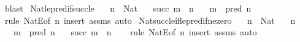 \begin{isabellebody}
\ blast%
\endisatagproof
{\isafoldproof}%
%
\isadelimproof
\isanewline
%
\endisadelimproof
\isanewline
{}\isamarkupfalse%
\ Nat{\isacharunderscore}{\kern0pt}le{\isacharunderscore}{\kern0pt}pred{\isacharunderscore}{\kern0pt}if{\isacharunderscore}{\kern0pt}succ{\isacharunderscore}{\kern0pt}le{\isacharcolon}{\kern0pt}\isanewline
\ \ \ {\isachardoublequoteopen}n\ {\isacharcolon}{\kern0pt}\ Nat{\isachardoublequoteclose}\isanewline
\ \ \ {\isachardoublequoteopen}succ\ m\ {\isasymle}\ n{\isachardoublequoteclose}\isanewline
\ \ \ {\isachardoublequoteopen}m\ {\isasymle}\ pred\ n{\isachardoublequoteclose}\isanewline
%
\isadelimproof
\ \ %
\endisadelimproof
%
\isatagproof
{}\isamarkupfalse%
\ {\isacharparenleft}{\kern0pt}rule\ NatE{\isacharbrackleft}{\kern0pt}of\ n{\isacharbrackright}{\kern0pt}{\isacharparenright}{\kern0pt}\ {\isacharparenleft}{\kern0pt}insert\ assms{\isacharcomma}{\kern0pt}\ auto{\isacharparenright}{\kern0pt}%
\endisatagproof
{\isafoldproof}%
%
\isadelimproof
\isanewline
%
\endisadelimproof
\isanewline
{}\isamarkupfalse%
\ Nat{\isacharunderscore}{\kern0pt}succ{\isacharunderscore}{\kern0pt}le{\isacharunderscore}{\kern0pt}if{\isacharunderscore}{\kern0pt}le{\isacharunderscore}{\kern0pt}pred{\isacharunderscore}{\kern0pt}if{\isacharunderscore}{\kern0pt}ne{\isacharunderscore}{\kern0pt}zero{\isacharcolon}{\kern0pt}\isanewline
\ \ \ {\isachardoublequoteopen}n\ {\isacharcolon}{\kern0pt}\ Nat{\isachardoublequoteclose}\isanewline
\ \ \ {\isachardoublequoteopen}n\ {\isasymnoteq}\ {}{\isachardoublequoteclose}\isanewline
\ \ \ {\isachardoublequoteopen}m\ {\isasymle}\ pred\ n{\isachardoublequoteclose}\isanewline
\ \ \ {\isachardoublequoteopen}succ\ m\ {\isasymle}\ n{\isachardoublequoteclose}\isanewline
%
\isadelimproof
\ \ %
\endisadelimproof
%
\isatagproof
{}\isamarkupfalse%
\ {\isacharparenleft}{\kern0pt}rule\ NatE{\isacharbrackleft}{\kern0pt}of\ n{\isacharbrackright}{\kern0pt}{\isacharparenright}{\kern0pt}\ {\isacharparenleft}{\kern0pt}insert\ assms{\isacharcomma}{\kern0pt}\ auto{\isacharparenright}{\kern0pt}%
\endisatagproof
{\isafoldproof}%
%
\isadelimproof
%
\endisadelimproof
%
\isadelimdocument
%
\endisadelimdocument
%
\isatagdocument
%
\isamarkuptrue%
%
\endisatagdocument
{\isafolddocument}%
%
\isadelimdocument
%
\endisadelimdocument
{}\isamarkupfalse%

\end{isabellebody}

